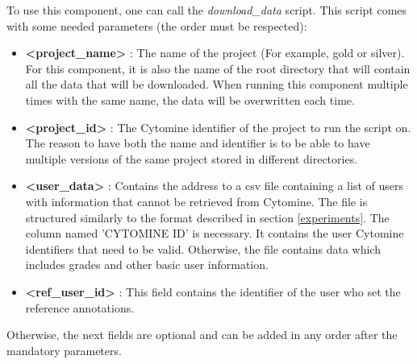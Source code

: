 \documentclass[a4paper,11pt]{report}
\numberwithin{figure}{section} %
\begin{document}
        To use this component, one can call the \textit{download\_data} script.
        This script comes with some needed parameters (the order must be respected):
        \begin{itemize}
            \item[\textbullet] \textbf{<project\_name>} : The name of the project (For example, gold or silver).
            For this component, it is also the name of the root directory that will contain all the data that will be downloaded.
            When running this component multiple times with the same name, the data will be overwritten each time.
            \item[\textbullet] \textbf{<project\_id>} : The Cytomine identifier of the project to run the script on.
            The reason to have both the name and identifier is to be able to have multiple versions of the same project stored in different directories.
            \item[\textbullet] \textbf{<user\_data>} : Contains the address to a csv file containing a list of users with information that cannot be retrieved from Cytomine.
            The file is structured similarly to the format described in section \ref{experiments}.
            The column named 'CYTOMINE ID' is necessary.
            It contains the user Cytomine identifiers that need to be valid.
            Otherwise, the file contains data which includes grades and other basic user information.
            \item[\textbullet] \textbf{<ref\_user\_id>} : This field contains the identifier of the user who set the reference annotations.
        \end{itemize}
        Otherwise, the next fields are optional and can be added in any order after the mandatory parameters.
\end{document}
